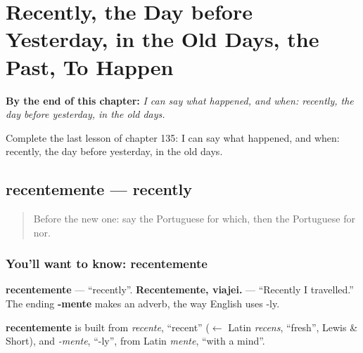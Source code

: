 
\chapter{Recently, the Day before Yesterday, in the Old Days, the Past, To Happen}
\label{ch:pt-recently-the-day-before-yesterday-in-the-old-days-the-past-to-happen}

\begin{chapteropening}
\textbf{By the end of this chapter:} \emph{I can say what happened, and when: recently, the day before yesterday, in the old days.}

Complete the last lesson of chapter 135: I can say what happened, and when: recently, the day before yesterday, in the old days.
\end{chapteropening}

\section[recentemente]{recentemente — recently}

\label{lesson:PT-C135-recentemente}



\begin{quote}
Before the new one: say the Portuguese for which, then the Portuguese for nor.
\end{quote}

\subsection*{You'll want to know: recentemente}
\textbf{recentemente} — \textquotedblleft{}recently\textquotedblright{}. \textbf{Recentemente, viajei.} — \textquotedblleft{}Recently I travelled.\textquotedblright{} The ending \textbf{-mente} makes an adverb, the way English uses -ly.

\begin{cousinweb}
\textbf{recentemente} is built from \emph{recente}, \textquotedblleft{}recent\textquotedblright{} ($\leftarrow$ Latin \emph{recens}, \textquotedblleft{}fresh\textquotedblright{}, Lewis \& Short), and \emph{-mente}, \textquotedblleft{}-ly\textquotedblright{}, from Latin \emph{mente}, \textquotedblleft{}with a mind\textquotedblright{}.
\end{cousinweb}

